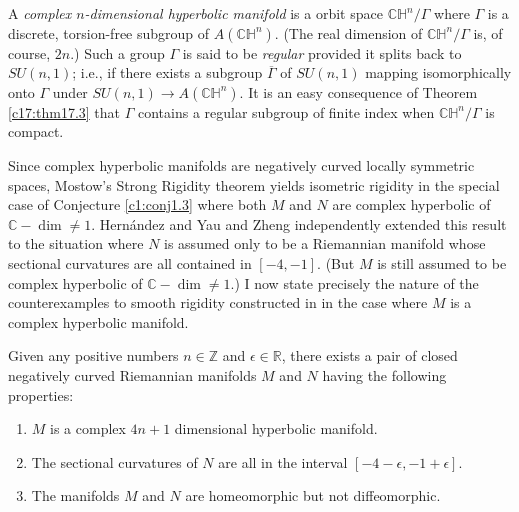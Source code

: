A {\em complex $n$-dimensional hyperbolic manifold} is a orbit space\break
$\mathbb{CH}^{n}/\Gamma$ where $\Gamma$ is a discrete, torsion-free
subgroup of $A(\mathbb{CH}^{n})$. (The real dimension of
$\mathbb{CH}^{n}/\Gamma$ is, of course, $2n$.) Such a group $\Gamma$
is said to be {\em regular} provided it splits back to $SU(n,1)$;
i.e., if there exists a subgroup $\overline{\Gamma}$ of $SU(n,1)$
mapping isomorphically onto $\Gamma$ under $SU(n,1)\to
A(\mathbb{CH}^{n})$. It is an easy consequence of Theorem
\ref{c17:thm17.3} that $\Gamma$ contains a regular subgroup of finite
index when $\mathbb{CH}^{n}/\Gamma$ is compact.

Since complex hyperbolic manifolds are negatively curved locally
symmetric spaces, Mostow's Strong Rigidity theorem yields isometric
rigidity in the special case of Conjecture \ref{c1:conj1.3} where both
$M$ and $N$ are complex hyperbolic of $\mathbb{C}-\dim\neq
1$. Hern\'andez \cite{58} and Yau and Zheng \cite{100} independently
extended this result to the situation where $N$ is assumed only to be
a Riemannian manifold whose sectional curvatures are all contained in
$[-4,-1]$. (But $M$ is still assumed to be complex hyperbolic of
$\mathbb{C}-\dim\neq 1$.) I now state precisely the nature of the
counterexamples to smooth rigidity constructed in \cite{46} in the
case where $M$ is a complex hyperbolic manifold.

\begin{thm}\label{c18:thm18.1}
Given any positive numbers $n\in \mathbb{Z}$ and $\epsilon\in
\mathbb{R}$, there exists a pair of closed negatively curved
Riemannian manifolds $M$ and $N$ having the following properties:
\begin{enumerate}
\item $M$ is a complex $4n+1$ dimensional hyperbolic manifold.

\item The sectional curvatures of $N$ are all in the interval
  $[-4-\epsilon,-1+\epsilon]$. 

\item The manifolds $M$ and $N$ are homeomorphic but not diffeomorphic.
\end{enumerate}
\end{thm}

